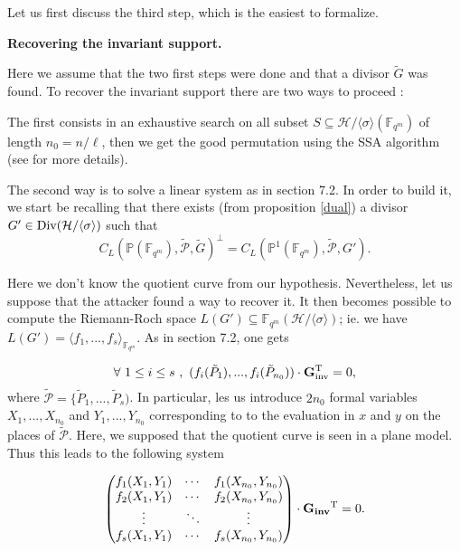 \documentclass[10pt]{article}
\newcommand{\s}{\vspace{0.3cm}}
\newcommand{\cd}{\cdot}
\newcommand{\fqm}{\mathbb{F}_{q^m}}
\newcommand{\su}{\subseteq}
\newcommand{\PR}{\mathcal{P}}
\begin{document}
Let us first discuss the third step, which is the easiest to formalize.

\s

\bf{Recovering the invariant support.}
\s

\rm  Here we assume that the two first steps were done and that a divisor $\tilde{G}$ was found. To recover the invariant support there are two ways to proceed :

\s

The first consists in an exhaustive search on all subset $S \su \mathcal{H}/\langle \sigma \rangle\left(\fqm\right)$ of length $n_0=n/\ell$, then we get the good permutation using the SSA algorithm (see \cite{SSA} for more details).

\s

The second way is to solve a linear system as in section 7.2. In order to build it, we start be recalling that there exists (from proposition \ref{dual}) a divisor $G' \in \rm Div \it (\mathcal{H}/\langle \sigma \rangle)$ such that 
\[ C_L(\mathbb{P}(\fqm),\tilde{\PR},\tilde{G})^{\perp} = C_L(\mathbb{P}^1(\fqm),\tilde{\PR},G').\]

Here we don't know the quotient curve from our hypothesis. Nevertheless, let us suppose that the attacker found a way to recover it. It then becomes possible to compute the Riemann-Roch space $L(G') \su \fqm(\mathcal{H}/\langle \sigma \rangle)$;
ie. we have $L(G') = \langle f_1,...,f_s \rangle_{\fqm}$. As in section 7.2, one gets 

\begin{equation*}
\forall \ 1 \leq i \leq s \ , \ (f_i(\tilde{P}_1),...,f_i(\tilde{P}_{n_0})) \cd \bf{G}\rm ^T_{inv} = 0,
\end{equation*}
where $\tilde{\PR} = \{\tilde{P}_1,...,\tilde{P}_s)$. In particular, les us introduce $2n_0$ formal variables $X_1,...,X_{n_0}$ and $Y_1,...,Y_{n_0}$ corresponding to to the evaluation in $x$ and $y$ on the places of $\tilde{\PR}$. Here, we supposed that the quotient curve is seen in a plane model. Thus this leads to the following system

\begin{equation*}
\begin{pmatrix}
f_1(X_1,Y_1) & \cdots & f_1(X_{n_0},Y_{n_0}) \\
f_2(X_1,Y_1) & \cdots & f_2(X_{n_0},Y_{n_0}) \\
\vdots & \ddots & \vdots \\
f_s(X_1,Y_1) & \cdots & f_s(X_{n_0},Y_{n_0}) \\
\end{pmatrix}
\cd \bf{G_{inv}} \rm{^T} = 0.
\end{equation*}
\end{document}
